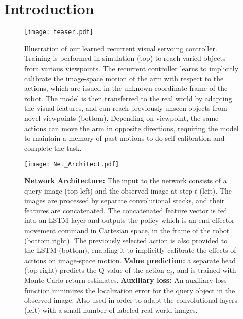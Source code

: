 \documentclass[10pt,twocolumn,letterpaper]{article}
\begin{document}
\section{Introduction}
\begin{figure}[t]
\begin{center}
\texttt{[image: teaser.pdf]}
\end{center}
\vspace{-0.2in}
\caption{Illustration of our learned recurrent visual servoing controller. Training is performed in simulation (top) to reach varied objects from various viewpoints. The recurrent controller learns to implicitly calibrate the image-space motion of the arm with respect to the actions, which are issued in the unknown coordinate frame of the robot. The model is then transferred to the real world by adapting the visual features, and can reach previously unseen objects from novel viewpoints (bottom). Depending on viewpoint, the same actions can move the arm in opposite directions, requiring the model to maintain a memory of past motions to do self-calibration and complete the task.}
\label{fig:teaser}
\vspace{-0.15in}
\end{figure}\begin{figure*}[t]
\begin{center}
\texttt{[image: Net\_Architect.pdf]}
\end{center}
\vspace{-.2in}
   \caption{\textbf{Network Architecture:} The input to the network consists of a query image (top-left) and the observed image at step $t$ (left). The images are processed by separate convolutional stacks, and their features are concatenated. The concatenated feature vector is fed into an LSTM layer and outputs the policy which is an end-effector movement command in Cartesian space, in the frame of the robot (bottom right). The previously selected action is also provided to the LSTM (bottom), enabling it to implicitly calibrate the effects of actions on image-space motion. \textbf{Value prediction:} a separate head (top right) predicts the Q-value of the action $a_t$, and is trained with Monte Carlo return estimates. \textbf{Auxiliary loss:} An auxiliary loss function minimizes the localization error for the query object in the observed image. Also used in order to adapt the convolutional layers (left) with a small number of labeled real-world images.}
\vspace{-.15in}
\label{fig:architecture}
\end{figure*}
\end{document}
